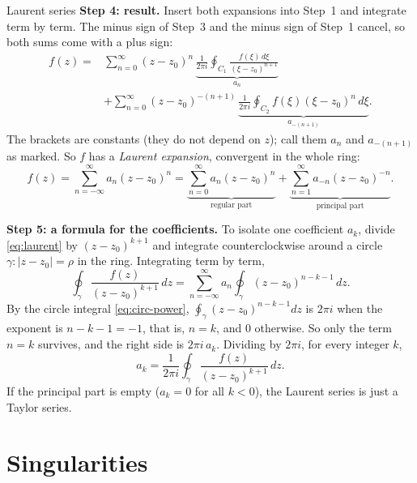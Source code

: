 \documentclass[11pt]{beamer}
\begin{document}
\begin{frame}[allowframebreaks=1.00]{Laurent series}
\textbf{Step 4: result.} Insert both expansions into Step~1 and integrate term by term. The minus sign
of Step~3 and the minus sign of Step~1 cancel, so both sums come with a plus sign:
\begin{align*}
 f(z)={}&\sum_{n=0}^{\infty}(z-z_0)^n\,\underbrace{\frac1{2\pi i}\oint_{C_1}\frac{f(\xi)\,d\xi}{(\xi-z_0)^{n+1}}}_{a_n}\\
 &+\sum_{n=0}^{\infty}(z-z_0)^{-(n+1)}\,\underbrace{\frac1{2\pi i}\oint_{C_2}f(\xi)(\xi-z_0)^{n}\,d\xi}_{a_{-(n+1)}} .
\end{align*}
The brackets are constants (they do not depend on \(z\)); call them \(a_n\) and \(a_{-(n+1)}\) as marked. So
\(f\) has a \emph{Laurent expansion}, convergent in the whole ring:
\begin{equation}
 f(z)=\sum_{n=-\infty}^{\infty}a_n(z-z_0)^n
 =\underbrace{\sum_{n=0}^{\infty}a_n(z-z_0)^n}_{\text{regular part}}
  +\underbrace{\sum_{n=1}^{\infty}a_{-n}(z-z_0)^{-n}}_{\text{principal part}}.
 \label{eq:laurent}
\end{equation}
\par\framebreak\par
\textbf{Step 5: a formula for the coefficients.} To isolate one coefficient \(a_k\), divide
\eqref{eq:laurent} by \((z-z_0)^{k+1}\) and integrate counterclockwise around a circle
\(\gamma:|z-z_0|=\rho\) in the ring. Integrating term by term,
\[
 \oint_\gamma\frac{f(z)}{(z-z_0)^{k+1}}\,dz
 =\sum_{n=-\infty}^{\infty}a_n\oint_\gamma(z-z_0)^{n-k-1}\,dz .
\]
By the circle integral \eqref{eq:circ-power}, \(\oint_\gamma(z-z_0)^{n-k-1}dz\) is \(2\pi i\) when the
exponent is \(n-k-1=-1\), that is, \(n=k\), and \(0\) otherwise. So only the term \(n=k\) survives, and
the right side is \(2\pi i\,a_k\). Dividing by \(2\pi i\), for every integer \(k\),
\begin{equation}
 a_k=\frac{1}{2\pi i}\oint_\gamma
      \frac{f(z)}{(z-z_0)^{k+1}}\,dz.
 \label{eq:laurent-coef}
\end{equation}
If the principal part is empty (\(a_k=0\) for all \(k<0\)), the Laurent series is just a Taylor series.
\end{frame}

\section{Singularities}
\end{document}
